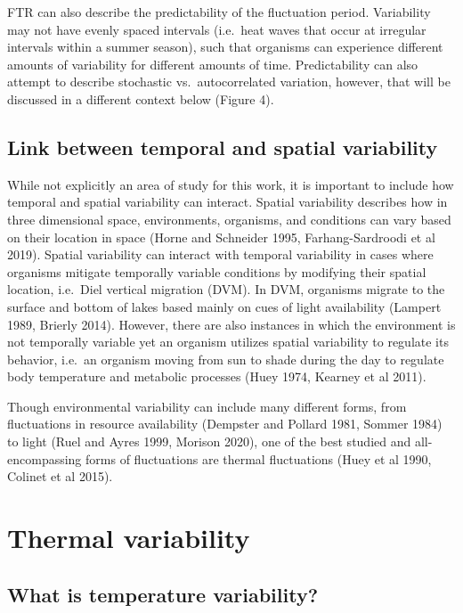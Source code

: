 \documentclass[12pt,twoside]{reedthesis}
\begin{document}
FTR can also describe the predictability of the fluctuation period. Variability may not have evenly spaced intervals (i.e.~heat waves that occur at irregular intervals within a summer season), such that organisms can experience different amounts of variability for different amounts of time. Predictability can also attempt to describe stochastic vs.~autocorrelated variation, however, that will be discussed in a different context below (Figure 4).

\hypertarget{link-between-temporal-and-spatial-variability}{%
\subsection{Link between temporal and spatial variability}\label{link-between-temporal-and-spatial-variability}}

While not explicitly an area of study for this work, it is important to include how temporal and spatial variability can interact. Spatial variability describes how in three dimensional space, environments, organisms, and conditions can vary based on their location in space (Horne and Schneider 1995, Farhang-Sardroodi et al 2019). Spatial variability can interact with temporal variability in cases where organisms mitigate temporally variable conditions by modifying their spatial location, i.e.~Diel vertical migration (DVM). In DVM, organisms migrate to the surface and bottom of lakes based mainly on cues of light availability (Lampert 1989, Brierly 2014). However, there are also instances in which the environment is not temporally variable yet an organism utilizes spatial variability to regulate its behavior, i.e.~an organism moving from sun to shade during the day to regulate body temperature and metabolic processes (Huey 1974, Kearney et al 2011).

Though environmental variability can include many different forms, from fluctuations in resource availability (Dempster and Pollard 1981, Sommer 1984) to light (Ruel and Ayres 1999, Morison 2020), one of the best studied and all-encompassing forms of fluctuations are thermal fluctuations (Huey et al 1990, Colinet et al 2015).

\hypertarget{thermal-variability}{%
\section{Thermal variability}\label{thermal-variability}}

\hypertarget{what-is-temperature-variability}{%
\subsection{What is temperature variability?}\label{what-is-temperature-variability}}
\end{document}
